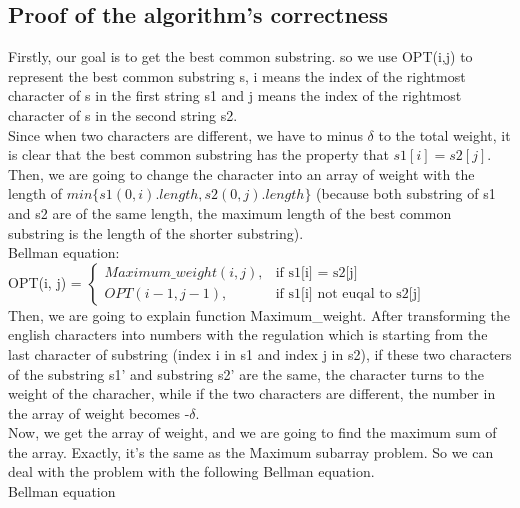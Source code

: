 \documentclass[]{article}
\begin{document}
	\subsection{Proof of the algorithm's correctness}
	
	Firstly, our goal is to get the best common substring. so we use OPT(i,j) to represent the best common substring s, i means the index of the rightmost character of s in the first string s1 and j means the index of the rightmost character of s in the second string s2.  \\ 
	
	\noindent Since when two characters are different, we have to minus $\delta$ to the total weight, it is clear that the best common substring has the property that $s1[i] = s2[j]$. Then, we are going to change the character into an array of weight with the length of $min\{s1(0,i).length, s2(0,j).length\}$ (because both substring of s1 and s2 are of the same length, the maximum length of the best common substring is the length of the shorter substring). \\            
	
	\noindent Bellman equation: \\
	
	OPT(i, j) =
	$\begin{cases} 
		Maximum\_weight(i, j),  & \mbox{if }\mbox{s1[i] = s2[j]} \\
		OPT(i-1, j-1), & \mbox{if }\mbox{s1[i] not euqal to s2[j]}
	\end{cases}$ \\
	
	\noindent Then, we are going to explain function Maximum\_weight. After transforming the english characters into numbers with the regulation which is starting from the last character of substring (index i in s1 and index j in s2), if these two characters of the substring s1' and substring s2' are the same, the character turns to the weight of the characher, while if the two characters are different, the number in the array of weight becomes -$\delta$.\\
	
	\noindent Now, we get the array of weight, and we are going to find the maximum sum of the array. Exactly, it's the same as the Maximum subarray problem. So we can deal with the problem with the following Bellman equation. \\
	
	Bellman equation\\
	
\end{document}
